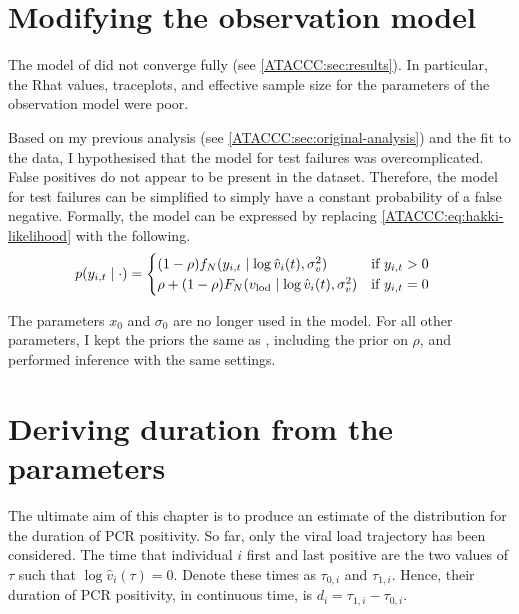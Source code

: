 \documentclass[thesis.tex]{subfiles}
\begin{document}
\section{Modifying the observation model} \label{ATACCC:sec:observation-modification}

The model of \textcite{hakkiOnset} did not converge fully (see \cref{ATACCC:sec:results}).
In particular, the Rhat values, traceplots, and effective sample size for the parameters of the observation model were poor.

Based on my previous analysis (see \cref{ATACCC:sec:original-analysis}) and the fit to the data, I hypothesised that the model for test failures was overcomplicated.
False positives do not appear to be present in the dataset.
Therefore, the model for test failures can be simplified to simply have a constant probability of a false negative.
Formally, the model can be expressed by replacing \cref{ATACCC:eq:hakki-likelihood} with the following.
\begin{align}
p(y_{i,t} \mid \cdot) &= \begin{cases}
    (1 - \rho) f_N(y_{i,t} \mid \log \hat{v}_i(t), \sigma_v^2) & \text{if $y_{i,t} > 0$}\\
    \rho + (1 - \rho) F_N(v_\text{lod} \mid \log \hat{v}_i(t), \sigma_v^2) & \text{if $y_{i,t} = 0$}
\end{cases}
\end{align}

The parameters $x_0$ and $\sigma_0$ are no longer used in the model.
For all other parameters, I kept the priors the same as \textcite{hakkiOnset}, including the prior on $\rho$, and performed inference with the same settings.


\section{Deriving duration from the parameters} \label{ATACCC:sec:duration}
The ultimate aim of this chapter is to produce an estimate of the distribution for the duration of PCR positivity.
So far, only the viral load trajectory has been considered.
The time that individual $i$ first and last positive are the two values of $\tau$ such that $\log \hat{v}_i(\tau) = 0$.
Denote these times as $\tau_{0,i}$ and $\tau_{1,i}$.
Hence, their duration of PCR positivity, in continuous time, is $d_i = \tau_{1,i} - \tau_{0,i}$.
\end{document}
